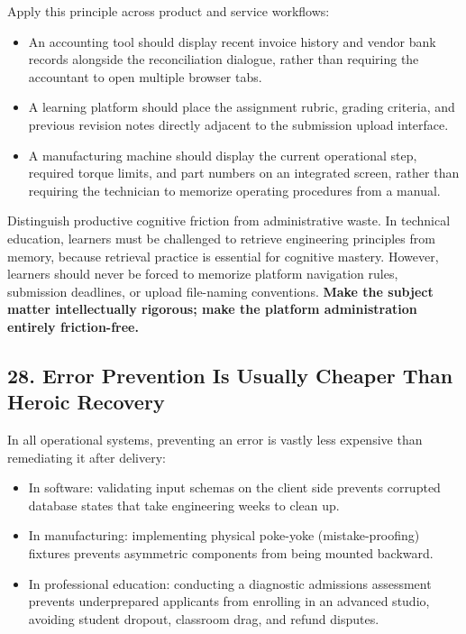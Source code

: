 Apply this principle across product and service workflows:
\begin{itemize}
    \item An accounting tool should display recent invoice history and vendor bank records alongside the reconciliation dialogue, rather than requiring the accountant to open multiple browser tabs.
    \item A learning platform should place the assignment rubric, grading criteria, and previous revision notes directly adjacent to the submission upload interface.
    \item A manufacturing machine should display the current operational step, required torque limits, and part numbers on an integrated screen, rather than requiring the technician to memorize operating procedures from a manual.
\end{itemize}

Distinguish productive cognitive friction from administrative waste. In technical education, learners must be challenged to retrieve engineering principles from memory, because retrieval practice is essential for cognitive mastery. However, learners should never be forced to memorize platform navigation rules, submission deadlines, or upload file-naming conventions. \textbf{Make the subject matter intellectually rigorous; make the platform administration entirely friction-free.}

\subsection*{28. Error Prevention Is Usually Cheaper Than Heroic Recovery}

In all operational systems, preventing an error is vastly less expensive than remediating it after delivery:
\begin{itemize}
    \item In software: validating input schemas on the client side prevents corrupted database states that take engineering weeks to clean up.
    \item In manufacturing: implementing physical poke-yoke (mistake-proofing) fixtures prevents asymmetric components from being mounted backward.
    \item In professional education: conducting a diagnostic admissions assessment prevents underprepared applicants from enrolling in an advanced studio, avoiding student dropout, classroom drag, and refund disputes.
\end{itemize}

